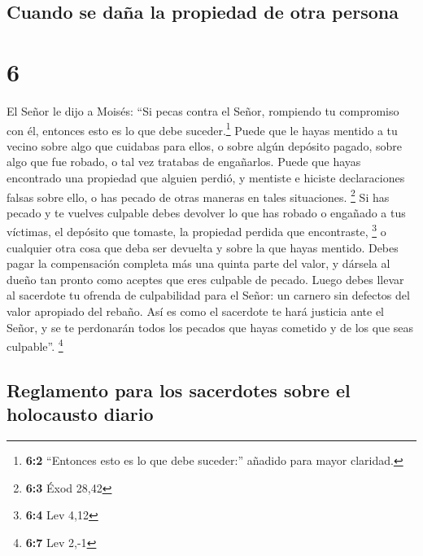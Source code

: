 \hypertarget{cuando-se-dauxf1a-la-propiedad-de-otra-persona}{%
\subsection{Cuando se daña la propiedad de otra
persona}\label{cuando-se-dauxf1a-la-propiedad-de-otra-persona}}

\hypertarget{section-5}{%
\section{6}\label{section-5}}

 El Señor le dijo a Moisés:  ``Si pecas
contra el Señor, rompiendo tu compromiso con él, entonces esto es lo que
debe suceder.\footnote{\textbf{6:2} ``Entonces esto es lo que debe
  suceder:'' añadido para mayor claridad.} Puede que le hayas mentido a
tu vecino sobre algo que cuidabas para ellos, o sobre algún depósito
pagado, sobre algo que fue robado, o tal vez tratabas de engañarlos.
 Puede que hayas encontrado una propiedad que alguien
perdió, y mentiste e hiciste declaraciones falsas sobre ello, o has
pecado de otras maneras en tales situaciones. \footnote{\textbf{6:3}
  Éxod 28,42}  Si has pecado y te vuelves culpable debes
devolver lo que has robado o engañado a tus víctimas, el depósito que
tomaste, la propiedad perdida que encontraste, \footnote{\textbf{6:4}
  Lev 4,12}  o cualquier otra cosa que deba ser devuelta y
sobre la que hayas mentido. Debes pagar la compensación completa más una
quinta parte del valor, y dársela al dueño tan pronto como aceptes que
eres culpable de pecado.  Luego debes llevar al sacerdote
tu ofrenda de culpabilidad para el Señor: un carnero sin defectos del
valor apropiado del rebaño.  Así es como el sacerdote te
hará justicia ante el Señor, y se te perdonarán todos los pecados que
hayas cometido y de los que seas culpable''. \footnote{\textbf{6:7} Lev
  2,-1}

\hypertarget{reglamento-para-los-sacerdotes-sobre-el-holocausto-diario}{%
\subsection{Reglamento para los sacerdotes sobre el holocausto
diario}\label{reglamento-para-los-sacerdotes-sobre-el-holocausto-diario}}


